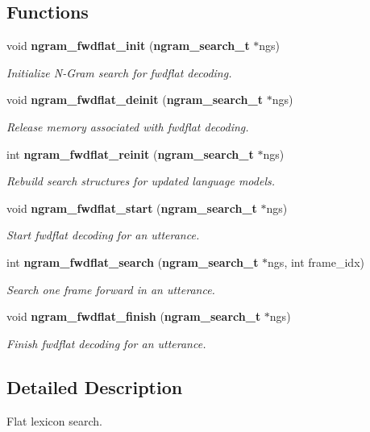 \subsection*{Functions}
\begin{DoxyCompactItemize}
\item 
void {\bf ngram\+\_\+fwdflat\+\_\+init} ({\bf ngram\+\_\+search\+\_\+t} $\ast$ngs)\label{ngram__search__fwdflat_8c_ad4b8ebd904c77f8a28f59cd5ca2c8307}

\begin{DoxyCompactList}\small\item\em Initialize N-\/\+Gram search for fwdflat decoding. \end{DoxyCompactList}\item 
void {\bf ngram\+\_\+fwdflat\+\_\+deinit} ({\bf ngram\+\_\+search\+\_\+t} $\ast$ngs)\label{ngram__search__fwdflat_8c_a8faf467f90162a7273b23304fc6e8586}

\begin{DoxyCompactList}\small\item\em Release memory associated with fwdflat decoding. \end{DoxyCompactList}\item 
int {\bf ngram\+\_\+fwdflat\+\_\+reinit} ({\bf ngram\+\_\+search\+\_\+t} $\ast$ngs)\label{ngram__search__fwdflat_8c_aa4879c06ddbc455a6f355084a9c574b4}

\begin{DoxyCompactList}\small\item\em Rebuild search structures for updated language models. \end{DoxyCompactList}\item 
void {\bf ngram\+\_\+fwdflat\+\_\+start} ({\bf ngram\+\_\+search\+\_\+t} $\ast$ngs)\label{ngram__search__fwdflat_8c_a763c2c7aaa5d7f9c5107af73552a2149}

\begin{DoxyCompactList}\small\item\em Start fwdflat decoding for an utterance. \end{DoxyCompactList}\item 
int {\bf ngram\+\_\+fwdflat\+\_\+search} ({\bf ngram\+\_\+search\+\_\+t} $\ast$ngs, int frame\+\_\+idx)\label{ngram__search__fwdflat_8c_ae77ef21ae92dbcc4b14f40469fbd4307}

\begin{DoxyCompactList}\small\item\em Search one frame forward in an utterance. \end{DoxyCompactList}\item 
void {\bf ngram\+\_\+fwdflat\+\_\+finish} ({\bf ngram\+\_\+search\+\_\+t} $\ast$ngs)\label{ngram__search__fwdflat_8c_ac855cf540ac4acdfa320629720ded6fe}

\begin{DoxyCompactList}\small\item\em Finish fwdflat decoding for an utterance. \end{DoxyCompactList}\end{DoxyCompactItemize}


\subsection{Detailed Description}
Flat lexicon search. 

